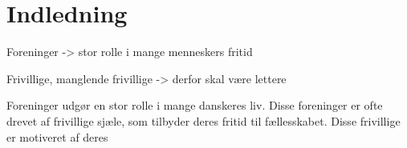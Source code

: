 \chapter{Indledning}

Foreninger -> stor rolle i mange menneskers fritid

Frivillige, manglende frivillige -> derfor skal være lettere

Foreninger udgør en stor rolle i mange danskeres liv. Disse foreninger er ofte drevet af frivillige sjæle, som tilbyder deres fritid til fællesskabet. Disse frivillige er motiveret af deres 



